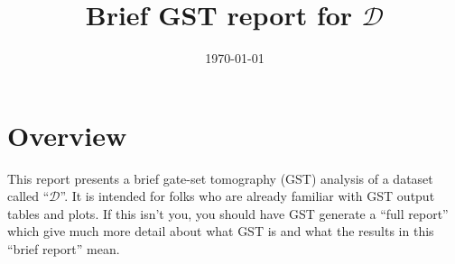 \documentclass{article}[11pt]
\begin{document}
\title{Brief GST report for $\mathcal{D}$}
\date{\vspace{-1cm}\today}

\begingroup
\let\center\flushleft
\let\endcenter\endflushleft
\maketitle
\endgroup

\section{Overview}
This report presents a brief gate-set tomography (GST) analysis of a dataset called ``$\mathcal{D}$''.   It is intended for folks who are already familiar with GST output tables and plots.  If this isn't you, you should have GST generate a ``full report'' which give much more detail about what GST is and what the results in this ``brief report'' mean.
\end{document}

